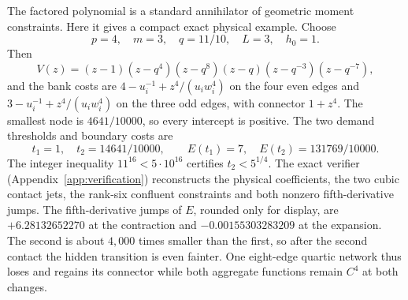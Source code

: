 The factored polynomial is a standard annihilator of geometric moment constraints. Here it gives a compact exact physical example. Choose
\begin{equation}\label{mc:explicitdouble}
 p=4,\quad m=3,\quad q=11/10,\quad L=3,\quad h_0=1.
\end{equation}
Then
\begin{equation}
 V(z)=(z-1)(z-q^4)(z-q^8)(z-q)(z-q^{-3})(z-q^{-7}),
\end{equation}
and the bank costs are $4-u_i^{-1}+z^4/(u_iw_i^4)$ on the four even edges and $3-u_i^{-1}+z^4/(u_iw_i^4)$ on the three odd edges, with connector $1+z^4$. The smallest node is $4641/10000$, so every intercept is positive. The two demand thresholds and boundary costs are
\begin{equation}
 t_1=1,\quad t_2=14641/10000,\qquad
 E(t_1)=7,\quad E(t_2)=131769/10000.
\end{equation}
The integer inequality $11^{16}<5\cdot10^{16}$ certifies $t_2<5^{1/4}$. The exact verifier (Appendix~\ref{app:verification}) reconstructs the physical coefficients, the two cubic contact jets, the rank-six confluent constraints and both nonzero fifth-derivative jumps. The fifth-derivative jumps of $E$, rounded only for display, are $+6.28132652270$ at the contraction and $-0.00155303283209$ at the expansion. The second is about $4{,}000$ times smaller than the first, so after the second contact the hidden transition is even fainter. One eight-edge quartic network thus loses and regains its connector while both aggregate functions remain $C^4$ at both changes.
